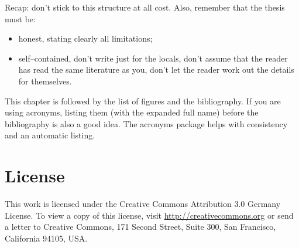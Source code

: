 \documentclass[a4paper,twoside, openright,12pt]{report}
\begin{document}
\vspace{\baselineskip}
Recap: don't stick to this structure at all cost. Also, remember that the thesis must be:

\begin{itemize}
	\item honest, stating clearly all limitations;
	\item self--contained, don't write just for the locals, don't assume that the reader has read the same literature as you, don't let the reader work out the details for themselves.
\end{itemize}



This chapter is followed by the list of figures and the bibliography. If you are using acronyms, listing them (with the expanded full name) before the bibliography is also a good idea. The acronyms package helps with consistency and an automatic listing.




\cleardoublepage
{}
\listoffigures 	 %


\cleardoublepage
{}





\cleardoublepage
\chapter*{License}
This work is licensed under the Creative Commons Attribution 3.0 Germany
License. To view a copy of this license,
visit \href{http://creativecommons.org/licenses/by/3.0/de/}{http://creativecommons.org} or send a letter
to Creative Commons, 171 Second Street, Suite 300, San
Francisco, California 94105, USA.
\end{document}
